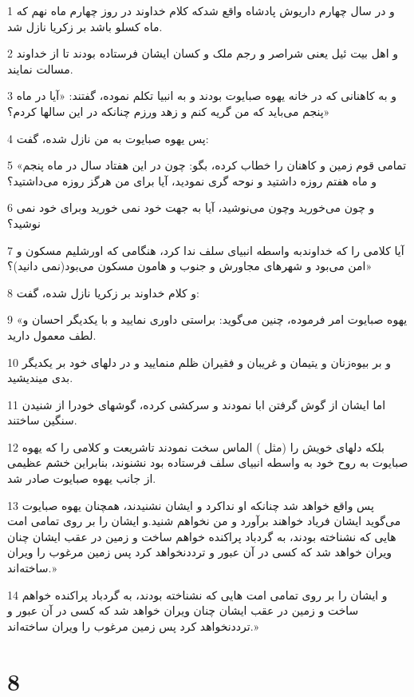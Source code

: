 \par 1 و در سال چهارم داریوش پادشاه واقع شدکه کلام خداوند در روز چهارم ماه نهم که ماه کسلو باشد بر زکریا نازل شد.
\par 2 و اهل بیت ئیل یعنی شراصر و رجم ملک و کسان ایشان فرستاده بودند تا از خداوند مسالت نمایند.
\par 3 و به کاهنانی که در خانه یهوه صبایوت بودند و به انبیا تکلم نموده، گفتند: «آیا در ماه پنجم می‌باید که من گریه کنم و زهد ورزم چنانکه در این سالها کردم؟»
\par 4 پس یهوه صبایوت به من نازل شده، گفت:
\par 5 «تمامی قوم زمین و کاهنان را خطاب کرده، بگو: چون در این هفتاد سال در ماه پنجم و ماه هفتم روزه داشتید و نوحه گری نمودید، آیا برای من هرگز روزه می‌داشتید؟
\par 6 و چون می‌خورید وچون می‌نوشید، آیا به جهت خود نمی خورید وبرای خود نمی نوشید؟
\par 7 آیا کلامی را که خداوندبه واسطه انبیای سلف ندا کرد، هنگامی که اورشلیم مسکون و امن می‌بود و شهرهای مجاورش و جنوب و هامون مسکون می‌بود(نمی دانید)؟»
\par 8 و کلام خداوند بر زکریا نازل شده، گفت:
\par 9 «یهوه صبایوت امر فرموده، چنین می‌گوید: براستی داوری نمایید و با یکدیگر احسان و لطف معمول دارید.
\par 10 و بر بیوه‌زنان و یتیمان و غریبان و فقیران ظلم منمایید و در دلهای خود بر یکدیگر بدی میندیشید.
\par 11 اما ایشان از گوش گرفتن ابا نمودند و سرکشی کرده، گوشهای خودرا از شنیدن سنگین ساختند.
\par 12 بلکه دلهای خویش را (مثل ) الماس سخت نمودند تاشریعت و کلامی را که یهوه صبایوت به روح خود به واسطه انبیای سلف فرستاده بود نشنوند، بنابراین خشم عظیمی از جانب یهوه صبایوت صادر شد.
\par 13 پس واقع خواهد شد چنانکه او نداکرد و ایشان نشنیدند، همچنان یهوه صبایوت می‌گوید ایشان فریاد خواهند برآورد و من نخواهم شنید.و ایشان را بر روی تمامی امت هایی که نشناخته بودند، به گردباد پراکنده خواهم ساخت و زمین در عقب ایشان چنان ویران خواهد شد که کسی در آن عبور و ترددنخواهد کرد پس زمین مرغوب را ویران ساخته‌اند.»
\par 14 و ایشان را بر روی تمامی امت هایی که نشناخته بودند، به گردباد پراکنده خواهم ساخت و زمین در عقب ایشان چنان ویران خواهد شد که کسی در آن عبور و ترددنخواهد کرد پس زمین مرغوب را ویران ساخته‌اند.»

\chapter{8}

